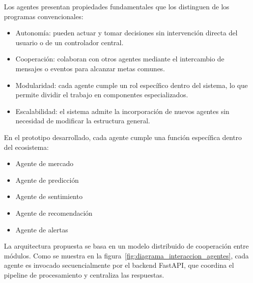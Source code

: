 Los agentes presentan propiedades fundamentales que los distinguen de los programas convencionales:

\begin{itemize}[leftmargin=1.5em]
    \item Autonomía: pueden actuar y tomar decisiones sin intervención directa del usuario o de un controlador central.
    \item Cooperación: colaboran con otros agentes mediante el intercambio de mensajes o eventos para alcanzar metas comunes.
    \item Modularidad: cada agente cumple un rol específico dentro del sistema, lo que permite dividir el trabajo en componentes especializados.
    \item Escalabilidad: el sistema admite la incorporación de nuevos agentes sin necesidad de modificar la estructura general.
\end{itemize}

En el prototipo desarrollado, cada agente cumple una función específica dentro del ecosistema:

\begin{itemize}[leftmargin=1.5em]
      \item Agente de mercado
      \item Agente de predicción
      \item Agente de sentimiento
      \item Agente de recomendación
      \item Agente de alertas
  \end{itemize}

La arquitectura propuesta se basa en un modelo distribuido de cooperación entre módulos. 
Como se muestra en la figura~\ref{fig:diagrama_interaccion_agentes}, cada agente es invocado secuencialmente por el backend FastAPI, que coordina el pipeline de   procesamiento y centraliza las respuestas.



